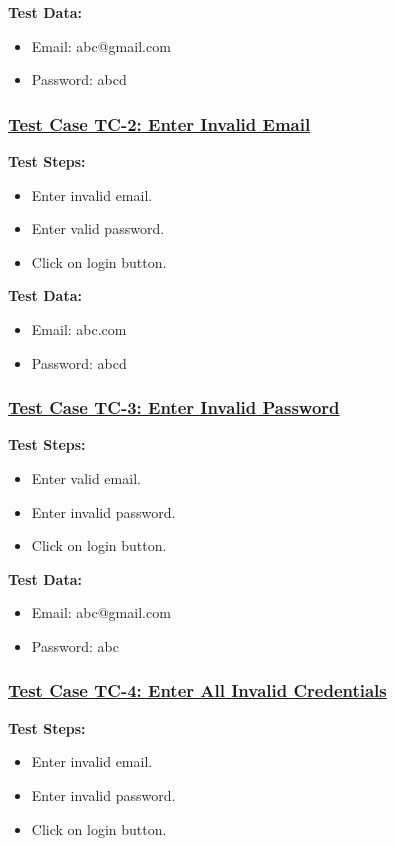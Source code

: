 \textbf{Test Data:}
\begin{itemize}

\item Email: abc@gmail.com
\item Password: abcd

\end{itemize}

\subsubsection{\underline{Test Case TC-2: Enter Invalid Email}}
\textbf{Test Steps:}
\begin{itemize}

\item Enter invalid email.
\item Enter valid password.
\item Click on login button.

\end{itemize}

\textbf{Test Data:}
\begin{itemize}

\item Email: abc.com
\item Password: abcd

\end{itemize}

\subsubsection{\underline{Test Case TC-3: Enter Invalid Password}}
\textbf{Test Steps:}
\begin{itemize}

\item Enter valid email.
\item Enter invalid password.
\item Click on login button.

\end{itemize}

\textbf{Test Data:}
\begin{itemize}

\item Email: abc@gmail.com
\item Password: abc

\end{itemize}

\subsubsection{\underline{Test Case TC-4: Enter All Invalid Credentials}}
\textbf{Test Steps:}
\begin{itemize}

\item Enter invalid email.
\item Enter invalid password.
\item Click on login button.

\end{itemize}

